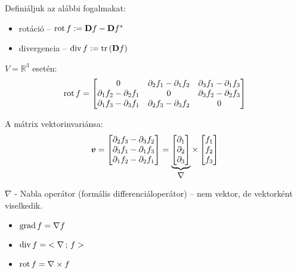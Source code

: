 \documentclass[main.tex]{subfiles}
\begin{document}
Definiáljuk az alábbi fogalmakat:
\begin{itemize}
  \item rotáció
        \tabto{2.4cm} – \tabto{3cm}
        $\operatorname{rot} f := \mathbf{D} f - \mathbf{D} f ^{*}$

  \item divergencia
        \tabto{2.4cm} – \tabto{3cm}
        $\operatorname{div} f := \tr \left( \mathbf{D} f \right)$
\end{itemize}

$V = \mathbb{R}^3$ esetén:
\begin{equation*}
  \operatorname{rot} f
  =
  \begin{bmatrix}
    0                               &
    \partial_2 f_1 - \partial_1 f_2 &
    \partial_3 f_1 - \partial_1 f_3
    \\
    \partial_1 f_2 - \partial_2 f_1 &
    0                               &
    \partial_3 f_2 - \partial_2 f_3
    \\
    \partial_1 f_3 - \partial_3 f_1 &
    \partial_2 f_3 - \partial_3 f_2 &
    0
  \end{bmatrix}
\end{equation*}

A mátrix vektorinvariánsa:
\begin{equation*}
  \boldsymbol{v}
  =
  \begin{bmatrix}
    \partial_2 f_3 - \partial_3 f_2 \\
    \partial_3 f_1 - \partial_1 f_3 \\
    \partial_1 f_2 - \partial_2 f_1
  \end{bmatrix}
  =
  \underbrace{
    \begin{bmatrix}
      \partial_1 \\
      \partial_2 \\
      \partial_3
    \end{bmatrix}
  }_{\displaystyle\nabla}
  \times
  \begin{bmatrix}
    f_1 \\
    f_2 \\
    f_3
  \end{bmatrix}
\end{equation*}

$\nabla$ - Nabla operátor (formális differenciáloperátor)
– nem vektor, de vektorként viselkedik.

\pagebreak


\begin{itemize}
  \item $\operatorname{grad} f = \nabla f$
  \item $\operatorname{div} f = \; < \nabla \, ; \, f >$
  \item $\operatorname{rot} f = \nabla \times f$
\end{itemize}
\end{document}
